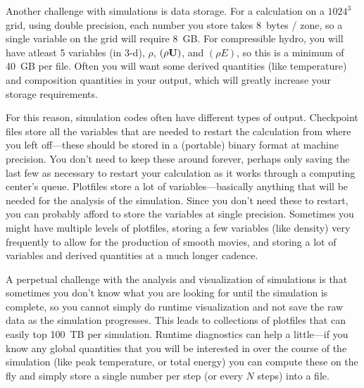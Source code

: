 Another challenge with simulations is data storage.  For a calculation
on a $1024^3$ grid, using double precision, each number you store
takes 8~bytes / zone, so a single variable on the grid will require
8~GB.  For compressible hydro, you will have atleast 5 variables (in
3-d), $\rho$, $(\rho {\bf U})$, and $(\rho E)$, so this is a minimum of 40~GB per
file.  Often you will want some derived quantities (like temperature)
and composition quantities in your output, which will greatly increase
your storage requirements.

For this reason, simulation codes often have different types of
output.  Checkpoint files store all the variables that are needed to
restart the calculation from where you left off---these should be
stored in a (portable) binary format at machine precision.  You don't
need to keep these around forever, perhaps only saving the last few as
necessary to restart your calculation as it works through a computing
center's queue.  Plotfiles store a lot of variables---basically anything
that will be needed for the analysis of the simulation.  Since you don't
need these to restart, you can probably afford to store the variables
at single precision.  Sometimes you might have multiple levels of plotfiles,
storing a few variables (like density) very frequently to allow for 
the production of smooth movies, and storing a lot of variables and 
derived quantities at a much longer cadence.

A perpetual challenge with the analysis and visualization of
simulations is that sometimes you don't know what you are looking for
until the simulation is complete, so you cannot simply do runtime
visualization and not save the raw data as the simulation progresses.
This leads to collections of plotfiles that can easily top 100~TB per
simulation.  Runtime diagnostics can help a little---if you know any
global quantities that you will be interested in over the course of
the simulation (like peak temperature, or total energy) you can
compute these on the fly and simply store a single number per step (or
every $N$ steps) into a file.
